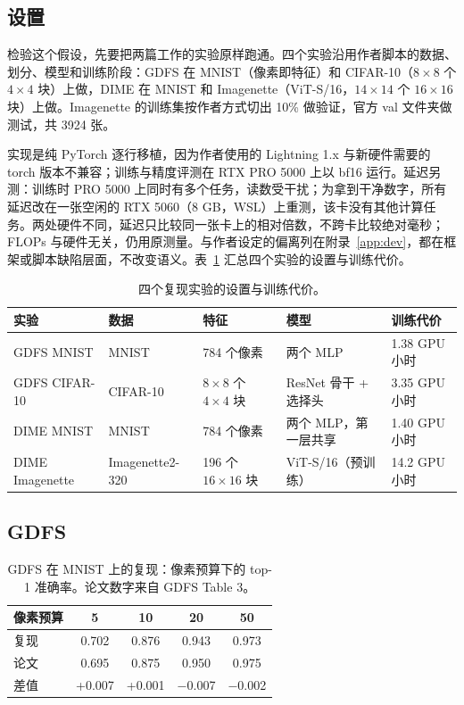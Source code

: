 \documentclass[11pt,a4paper,UTF8,fontset=none]{ctexart}
\begin{document}
\subsection{设置}

检验这个假设，先要把两篇工作的实验原样跑通。四个实验沿用作者脚本的数据、划分、模型和训练阶段：GDFS 在 MNIST（像素即特征）和 CIFAR-10（$8\times8$ 个 $4\times4$ 块）上做，DIME 在 MNIST 和 Imagenette（ViT-S/16，$14\times14$ 个 $16\times16$ 块）上做。Imagenette 的训练集按作者方式切出 10\% 做验证，官方 val 文件夹做测试，共 3924 张。

实现是纯 PyTorch 逐行移植，因为作者使用的 Lightning 1.x 与新硬件需要的 torch 版本不兼容；训练与精度评测在 RTX PRO 5000 上以 bf16 运行。延迟另测：训练时 PRO 5000 上同时有多个任务，读数受干扰；为拿到干净数字，所有延迟改在一张空闲的 RTX 5060（8 GB，WSL）上重测，该卡没有其他计算任务。两处硬件不同，延迟只比较同一张卡上的相对倍数，不跨卡比较绝对毫秒；FLOPs 与硬件无关，仍用原测量。与作者设定的偏离列在附录~\ref{app:dev}，都在框架或脚本缺陷层面，不改变语义。表~\ref{tab:setup} 汇总四个实验的设置与训练代价。

\begin{table}[H]
\centering
\caption{四个复现实验的设置与训练代价。}
\label{tab:setup}
\small
\begin{tabular}{lllll}
\toprule
实验 & 数据 & 特征 & 模型 & 训练代价 \\
\midrule
GDFS MNIST & MNIST & 784 个像素 & 两个 MLP & 1.38 GPU 小时 \\
GDFS CIFAR-10 & CIFAR-10 & $8\times8$ 个 $4\times4$ 块 & ResNet 骨干 + 选择头 & 3.35 GPU 小时 \\
DIME MNIST & MNIST & 784 个像素 & 两个 MLP，第一层共享 & 1.40 GPU 小时 \\
DIME Imagenette & Imagenette2-320 & 196 个 $16\times16$ 块 & ViT-S/16（预训练） & 14.2 GPU 小时 \\
\bottomrule
\end{tabular}
\end{table}

\subsection{GDFS}

\begin{table}[H]
\centering
\caption{GDFS 在 MNIST 上的复现：像素预算下的 top-1 准确率。论文数字来自 GDFS Table 3。}
\label{tab:gdfs-mnist}
\small
\begin{tabular}{lcccc}
\toprule
像素预算 & 5 & 10 & 20 & 50 \\
\midrule
复现 & 0.702 & 0.876 & 0.943 & 0.973 \\
论文 & 0.695 & 0.875 & 0.950 & 0.975 \\
差值 & +0.007 & +0.001 & $-$0.007 & $-$0.002 \\
\bottomrule
\end{tabular}
\end{table}
\end{document}
